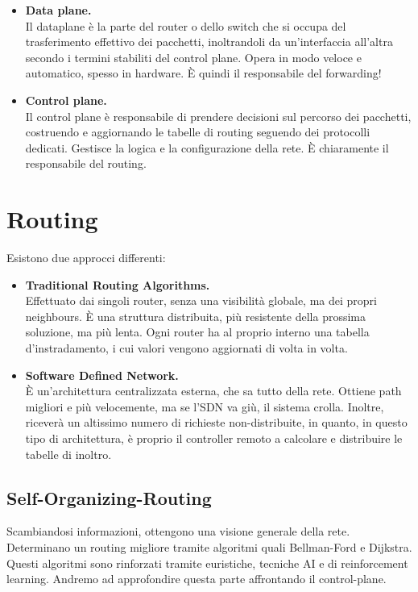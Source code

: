 \begin{itemize}
	\item \textbf{Data plane.}\\
	Il dataplane è la parte del router o dello switch che si occupa del trasferimento effettivo dei pacchetti, inoltrandoli da un’interfaccia all’altra secondo i termini stabiliti del control plane. Opera in modo veloce e automatico, spesso in hardware. È quindi il responsabile del forwarding!
	
	\item \textbf{Control plane.}\\
	Il control plane è responsabile di prendere decisioni sul percorso dei pacchetti, costruendo e aggiornando le tabelle di routing seguendo dei protocolli dedicati. Gestisce la logica e la configurazione della rete. È chiaramente il responsabile del routing.
\end{itemize}

\newpage

\section{Routing}

Esistono due approcci differenti:
\begin{itemize}
	\item \textbf{Traditional Routing Algorithms.}\\
	Effettuato dai singoli router, senza una visibilità globale, ma dei propri neighbours. È una struttura distribuita, più resistente della prossima soluzione, ma più lenta. Ogni router ha al proprio interno una tabella d'instradamento, i cui valori vengono aggiornati di volta in volta.
	\item \textbf{Software Defined Network.}\\
	È un'architettura centralizzata esterna, che sa tutto della rete. Ottiene path migliori e più velocemente, ma se l'SDN va giù, il sistema crolla. Inoltre, riceverà un altissimo numero di richieste non-distribuite, in quanto, in questo tipo di architettura, è proprio il controller remoto a calcolare e distribuire le tabelle di inoltro.
	
\end{itemize}
\subsection{Self-Organizing-Routing}
Scambiandosi informazioni, ottengono una visione generale della rete. Determinano un routing migliore tramite algoritmi quali Bellman-Ford e Dijkstra. Questi algoritmi sono rinforzati tramite euristiche, tecniche AI e di reinforcement learning. Andremo ad approfondire questa parte affrontando il control-plane. 

